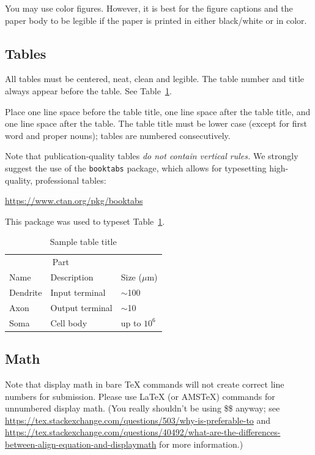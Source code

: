 \documentclass{article}
\begin{document}
You may use color figures.  However, it is best for the figure captions and the
paper body to be legible if the paper is printed in either black/white or in
color.


\subsection{Tables}


All tables must be centered, neat, clean and legible.  The table number and
title always appear before the table.  See Table~\ref{sample-table}.


Place one line space before the table title, one line space after the
table title, and one line space after the table. The table title must
be lower case (except for first word and proper nouns); tables are
numbered consecutively.


Note that publication-quality tables \emph{do not contain vertical rules.} We
strongly suggest the use of the \verb+booktabs+ package, which allows for
typesetting high-quality, professional tables:
\begin{center}
  \url{https://www.ctan.org/pkg/booktabs}
\end{center}
This package was used to typeset Table~\ref{sample-table}.


\begin{table}
  \caption{Sample table title}
  \label{sample-table}
  \centering
  \begin{tabular}{lll}
    \toprule
    \multicolumn{2}{c}{Part}                   \\
    \cmidrule(r){1-2}
    Name     & Description     & Size ($\mu$m) \\
    \midrule
    Dendrite & Input terminal  & $\sim$100     \\
    Axon     & Output terminal & $\sim$10      \\
    Soma     & Cell body       & up to $10^6$  \\
    \bottomrule
  \end{tabular}
\end{table}

\subsection{Math}
Note that display math in bare TeX commands will not create correct line numbers for submission. Please use LaTeX (or AMSTeX) commands for unnumbered display math. (You really shouldn't be using \$\$ anyway; see \url{https://tex.stackexchange.com/questions/503/why-is-preferable-to} and \url{https://tex.stackexchange.com/questions/40492/what-are-the-differences-between-align-equation-and-displaymath} for more information.)
\end{document}
